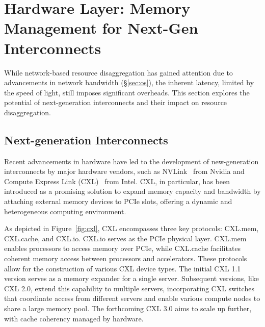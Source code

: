 \chapter{Hardware Layer: Memory Management for Next-Gen Interconnects}
\label{chap:hardware}
While network-based resource disaggregation has gained attention due to advancements in network bandwidth (\S\ref{sec:os}), the inherent latency, limited by the speed of light, still imposes significant overheads. This section explores the potential of next-generation interconnects and their impact on resource disaggregation.

\section{Next-generation Interconnects}

Recent advancements in hardware have led to the development of new-generation interconnects by major hardware vendors, such as NVLink~\cite{nvlink} from Nvidia and Compute Express Link (CXL)~\cite{cxl} from Intel. CXL, in particular, has been introduced as a promising solution to expand memory capacity and bandwidth by attaching external memory devices to PCIe slots, offering a dynamic and heterogeneous computing environment.

As depicted in Figure~\ref{fig:cxl}, CXL encompasses three key protocols: CXL.mem, CXL.cache, and CXL.io. CXL.io serves as the PCIe physical layer. CXL.mem enables processors to access memory over PCIe, while CXL.cache facilitates coherent memory access between processors and accelerators. These protocols allow for the construction of various CXL device types. The initial CXL 1.1 version serves as a memory expander for a single server. Subsequent versions, like CXL 2.0, extend this capability to multiple servers, incorporating CXL switches that coordinate access from different servers and enable various compute nodes to share a large memory pool. The forthcoming CXL 3.0 aims to scale up further, with cache coherency managed by hardware.


